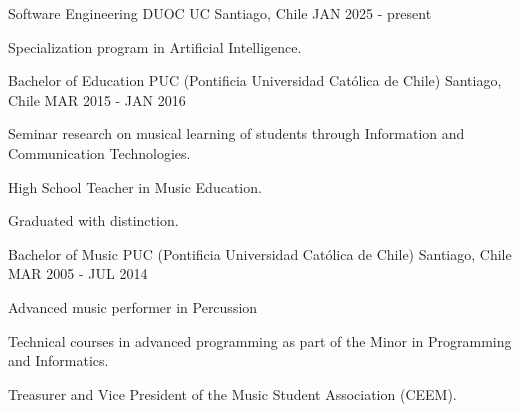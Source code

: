 

\begin{cventries}

  \cventry
    {Software Engineering} %
    {DUOC UC} %
    {Santiago, Chile} %
    {JAN 2025 - present} %
    {
      \begin{cvitems} %
        \item {Specialization program in Artificial Intelligence.}
      \end{cvitems}
    }

  \cventry
    {Bachelor of Education} %
    {PUC (Pontificia Universidad Católica de Chile)} %
    {Santiago, Chile} %
    {MAR 2015 - JAN 2016} %
    {
      \begin{cvitems} %
        \item {Seminar research on musical learning of students through Information and Communication Technologies.}
        \item {High School Teacher in Music Education.}
        \item {Graduated with distinction.}
      \end{cvitems}
    }

  \cventry
    {Bachelor of Music} %
    {PUC (Pontificia Universidad Católica de Chile)} %
    {Santiago, Chile} %
    {MAR 2005 - JUL 2014} %
    {
	    \begin{cvitems} %
	     	\item {Advanced music performer in Percussion}
	     	\item {Technical courses in advanced programming as part of the Minor in Programming and Informatics.}
	     	\item {Treasurer and Vice President of the Music Student Association (CEEM).}
	    \end{cvitems}
    }

\end{cventries}
